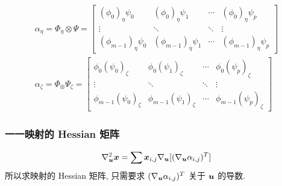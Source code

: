 \documentclass{beamer}
\numberwithin{subsection}{section}
\begin{document}
\begin{frame}
   \begin{align*}
       \alpha_\eta = \Phi_\eta \otimes \Psi =
       \begin{bmatrix}
      (\phi_0)_\eta \psi_0 & (\phi_0)_\eta \psi_1  & \cdots & (\phi_0)_\eta \psi_p \\ 
       \vdots        &   \ddots       & \ddots &  \vdots       \\
       (\phi_{m-1})_\eta \psi_0 &  (\phi_{m-1})_\eta \psi_1 &  \cdots&
       (\phi_{m-1})_\eta\psi_p  
       \end{bmatrix}\\
       \alpha_\zeta = \Phi_ \otimes \Psi_\zeta = 
       \begin{bmatrix}
       \phi_0 (\psi_0)_\zeta & \phi_0 (\psi_1)_\zeta  & \cdots & \phi_0
       (\psi_p)_\zeta \\ 
       \vdots        &   \ddots       & \ddots &  \vdots       \\
       \phi_{m-1} (\psi_0)_\zeta &  \phi_{m-1} (\psi_1)_\zeta &  \cdots&
       \phi_{m-1}(\psi_p)_\zeta
       \end{bmatrix} 
    \end{align*}
\end{frame}

\begin{frame}
    \frametitle{一一映射的 Hessian 矩阵}
    \begin{align*}
        \nabla_{\boldsymbol u}^2 {\boldsymbol x} = \sum{\boldsymbol x}_{i,j} \nabla_{\boldsymbol u}[(\nabla_{\boldsymbol u}
        \alpha_{i,j})^T]
    \end{align*}
    所以求映射的 Hessian 矩阵, 只需要求 $(\nabla_{\boldsymbol u} \alpha_{i,j})^T$ 关于
    ${\boldsymbol u}$ 的导数.
\end{frame}
\end{document}
